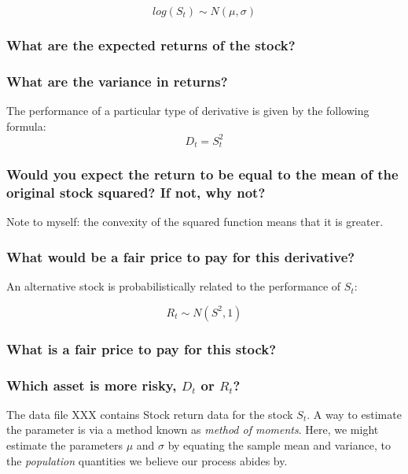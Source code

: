 \documentclass[11pt,fullpage]{book}
\begin{document}
\begin{equation}
log(S_t) \sim N(\mu,\sigma)
\end{equation}

\subsubsection{What are the expected returns of the stock?}
\subsubsection{What are the variance in returns?}

The performance of a particular type of derivative is given by the following formula:
\begin{equation}
D_t = S_t^2
\end{equation}

\subsubsection{Would you expect the return to be equal to the mean of the original stock squared? If not, why not?}
Note to myself: the convexity of the squared function means that it is greater.
\subsubsection{What would be a fair price to pay for this derivative?}

An alternative stock is probabilistically related to the performance of $S_t$:

\begin{equation}
R_t \sim N(S^2,1)
\end{equation}

\subsubsection{What is a fair price to pay for this stock?}
\subsubsection{Which asset is more risky, $D_t$ or $R_t$?}

The data file XXX contains Stock return data for the stock $S_t$. A way to estimate the parameter is via a method known as \textit{method of moments}. Here, we might estimate the parameters $\mu$ and $\sigma$ by equating the sample mean and variance, to the \textit{population} quantities we believe our process abides by.
\end{document}
